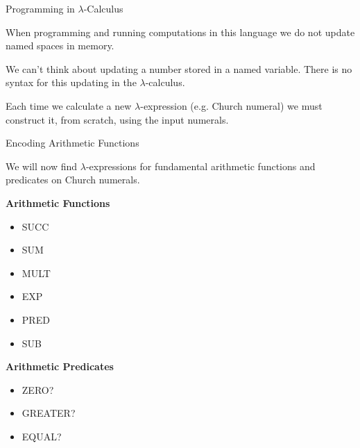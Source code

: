 \documentclass{beamer}
\begin{document}
\begin{frame}{Programming in $\lambda$-Calculus}

    
    
    When programming and running computations in this language we do not update named spaces in memory. 
    
    \vspace{0.5cm}
    
    We can't think about updating a number stored in a named variable. There is no syntax for this updating in the $\lambda$-calculus.
    
    \vspace{0.5cm}
    
    Each time we calculate a new $\lambda$-expression (e.g. Church numeral) we must construct it, from scratch, using the input numerals. 
    
\end{frame}

\begin{frame}{Encoding Arithmetic Functions}

    We will now find $\lambda$-expressions for fundamental arithmetic functions and predicates on Church numerals.
    
    {\bf Arithmetic Functions}
    \begin{itemize}
        \item[] SUCC
        \item[] SUM
        \item[] MULT
        \item[] EXP
        \item[] PRED
        \item[] SUB
    \end{itemize}
    
    {\bf Arithmetic Predicates}
    \begin{itemize}
        \item[] ZERO?
        \item[] GREATER?
        \item[] EQUAL?
    \end{itemize}
    
\end{frame}
\end{document}
